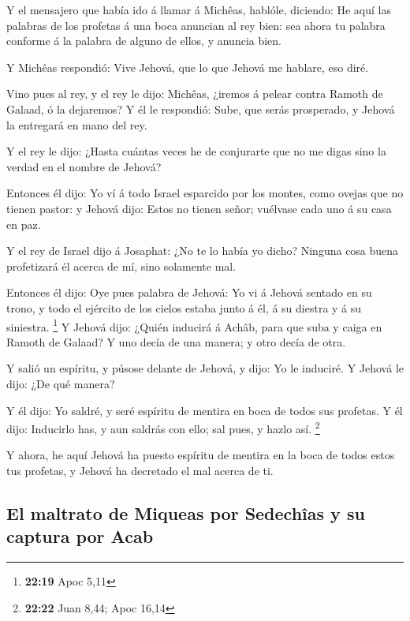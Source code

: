  Y el mensajero que había ido á llamar á Michêas, hablóle,
diciendo: He aquí las palabras de los profetas á una boca anuncian al
rey bien: sea ahora tu palabra conforme á la palabra de alguno de ellos,
y anuncia bien.

 Y Michêas respondió: Vive Jehová, que lo que Jehová me
hablare, eso diré.

 Vino pues al rey, y el rey le dijo: Michêas, ¿iremos á
pelear contra Ramoth de Galaad, ó la dejaremos? Y él le respondió: Sube,
que serás prosperado, y Jehová la entregará en mano del rey.

 Y el rey le dijo: ¿Hasta cuántas veces he de conjurarte
que no me digas sino la verdad en el nombre de Jehová?

 Entonces él dijo: Yo ví á todo Israel esparcido por los
montes, como ovejas que no tienen pastor: y Jehová dijo: Estos no tienen
señor; vuélvase cada uno á su casa en paz.

 Y el rey de Israel dijo á Josaphat: ¿No te lo había yo
dicho? Ninguna cosa buena profetizará él acerca de mí, sino solamente
mal.

 Entonces él dijo: Oye pues palabra de Jehová: Yo vi á
Jehová sentado en su trono, y todo el ejército de los cielos estaba
junto á él, á su diestra y á su siniestra. \footnote{\textbf{22:19} Apoc
  5,11}  Y Jehová dijo: ¿Quién inducirá á Achâb, para que
suba y caiga en Ramoth de Galaad? Y uno decía de una manera; y otro
decía de otra.

 Y salió un espíritu, y púsose delante de Jehová, y dijo:
Yo le induciré. Y Jehová le dijo: ¿De qué manera?

 Y él dijo: Yo saldré, y seré espíritu de mentira en boca
de todos sus profetas. Y él dijo: Inducirlo has, y aun saldrás con ello;
sal pues, y hazlo así. \footnote{\textbf{22:22} Juan 8,44; Apoc 16,14}

 Y ahora, he aquí Jehová ha puesto espíritu de mentira en
la boca de todos estos tus profetas, y Jehová ha decretado el mal acerca
de ti.

\hypertarget{el-maltrato-de-miqueas-por-sedechuxeeas-y-su-captura-por-acab}{%
\subsection{El maltrato de Miqueas por Sedechîas y su captura por
Acab}\label{el-maltrato-de-miqueas-por-sedechuxeeas-y-su-captura-por-acab}}

